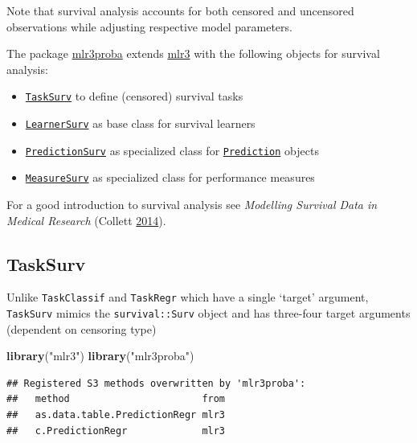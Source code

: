 \documentclass[]{scrbook}
\newenvironment{Shaded}{\begin{snugshade}}{\end{snugshade}}
\newcommand{\KeywordTok}[1]{\textcolor[rgb]{0.13,0.29,0.53}{\textbf{#1}}}
\newcommand{\NormalTok}[1]{#1}
\newcommand{\StringTok}[1]{\textcolor[rgb]{0.31,0.60,0.02}{#1}}
\providecommand{\tightlist}{%
  \setlength{\itemsep}{0pt}\setlength{\parskip}{0pt}}
\renewenvironment{Shaded} {\begin{snugshade}\small} {\end{snugshade}}
\begin{document}
Note that survival analysis accounts for both censored and uncensored observations while adjusting respective model parameters.

The package \href{https://mlr3proba.mlr-org.com}{mlr3proba} extends \href{https://mlr3.mlr-org.com}{mlr3} with the following objects for survival analysis:

\begin{itemize}
\tightlist
\item
  \href{https://mlr3proba.mlr-org.com/reference/TaskSurv.html}{\texttt{TaskSurv}} to define (censored) survival tasks
\item
  \href{https://mlr3proba.mlr-org.com/reference/LearnerSurv.html}{\texttt{LearnerSurv}} as base class for survival learners
\item
  \href{https://mlr3proba.mlr-org.com/reference/PredictionSurv.html}{\texttt{PredictionSurv}} as specialized class for \href{https://mlr3.mlr-org.com/reference/Prediction.html}{\texttt{Prediction}} objects
\item
  \href{https://mlr3proba.mlr-org.com/reference/MeasureSurv.html}{\texttt{MeasureSurv}} as specialized class for performance measures
\end{itemize}

For a good introduction to survival analysis see \emph{Modelling Survival Data in Medical Research} (Collett \protect\hyperlink{ref-Collett2014}{2014}).

\hypertarget{tasksurv}{%
\subsection{TaskSurv}\label{tasksurv}}

Unlike \texttt{TaskClassif} and \texttt{TaskRegr} which have a single `target' argument, \texttt{TaskSurv} mimics the
\texttt{survival::Surv} object and has three-four target arguments (dependent on censoring type)

\begin{Shaded}
\begin{Highlighting}[]
\KeywordTok{library}\NormalTok{(}\StringTok{"mlr3"}\NormalTok{)}
\KeywordTok{library}\NormalTok{(}\StringTok{"mlr3proba"}\NormalTok{)}
\end{Highlighting}
\end{Shaded}

\begin{verbatim}
## Registered S3 methods overwritten by 'mlr3proba':
##   method                       from
##   as.data.table.PredictionRegr mlr3
##   c.PredictionRegr             mlr3
\end{verbatim}
\end{document}
